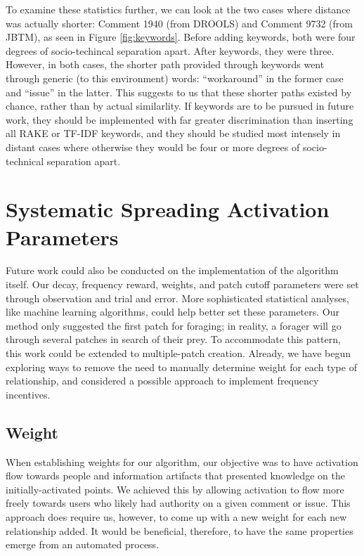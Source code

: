 To examine these statistics further, we can look at the two cases where distance was actually shorter: Comment 1940 (from DROOLS) and Comment 9732 (from JBTM), as seen in Figure \ref{fig:keywords}. Before adding keywords, both were four degrees of socio-techincal separation apart. After keywords, they were three. However, in both cases, the shorter path provided through keywords went through generic (to this environment) words: ``workaround'' in the former case and ``issue'' in the latter. This suggests to us that these shorter paths existed by chance, rather than by actual similarlity. If keywords are to be pursued in future work, they should be implemented with far greater discrimination than inserting all RAKE or TF-IDF keywords, and they should be studied most intensely in distant cases where otherwise they would be four or more degrees of socio-technical separation apart. 

\section{Systematic Spreading Activation Parameters}
Future work could also be conducted on the implementation of the algorithm itself. Our decay, frequency reward, weights, and patch cutoff parameters were set through observation and trial and error. More sophisticated statistical analyses, like machine learning algorithms, could help better set these parameters. Our method only suggested the first patch for foraging; in reality, a forager will go through several patches in search of their prey. To accommodate this pattern, this work could be extended to multiple-patch creation. Already, we have begun exploring ways to remove the need to manually determine weight for each type of relationship, and considered a possible approach to implement frequency incentives.

\subsection{Weight}
When establishing weights for our algorithm, our objective was to have activation flow towards people and information artifacts that presented knowledge on the initially-activated points. We achieved this by allowing activation to flow more freely towards users who likely had authority on a given comment or issue. This approach does require us, however, to come up with a new weight for each new relationship added. It would be beneficial, therefore, to have the same properties emerge from an automated process.

